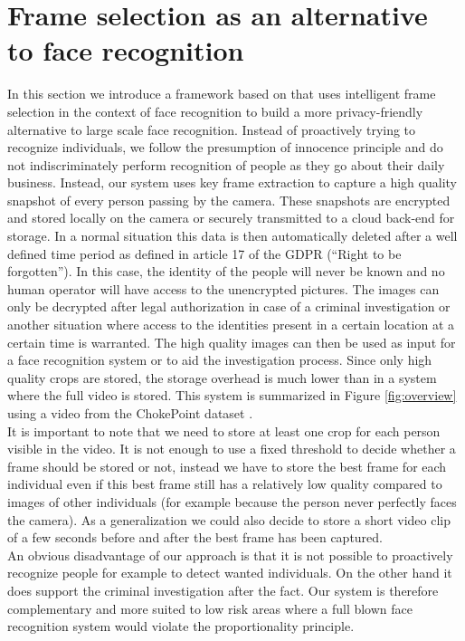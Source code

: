 \documentclass[letterpaper]{article} %
\begin{document}
\section{Frame selection as an alternative to face recognition}
\label{section:privacy_preserving_appr}
In this section we introduce a framework based on \cite{simoens2013scalable} that uses intelligent frame selection in the context of face recognition to build a more privacy-friendly alternative to large scale face recognition. Instead of proactively trying to recognize individuals, we follow the presumption of innocence principle and do not indiscriminately perform recognition of people as they go about their daily business. Instead, our system uses key frame extraction to capture a high quality snapshot of every person passing by the camera. These snapshots are encrypted and stored locally on the camera or securely transmitted to a cloud back-end for storage. In a normal situation this data is then automatically deleted after a well defined time period as defined in article 17 of the GDPR (``Right to be forgotten''). In this case, the identity of the people will never be known and no human operator will have access to the unencrypted pictures. The images can only be decrypted after legal authorization in case of a criminal investigation or another situation where access to the identities present in a certain location at a certain time is warranted. The high quality images can then be used as input for a face recognition system or to aid the investigation process. Since only high quality crops are stored, the storage overhead is much lower than in a system where the full video is stored. This system is summarized in Figure \ref{fig:overview} using a video from the ChokePoint dataset \cite{wong_cvprw_2011}.
\\
\newline
It is important to note that we need to store at least one crop for each person visible in the video. It is not enough to use a fixed threshold to decide whether a frame should be stored or not, instead we have to store the best frame for each individual even if this best frame still has a relatively low quality compared to images of other individuals (for example because the person never perfectly faces the camera). As a generalization we could also decide to store a short video clip of a few seconds before and after the best frame has been captured.
\\
\newline
An obvious disadvantage of our approach is that it is not possible to proactively recognize people for example to detect wanted individuals. On the other hand it does support the criminal investigation after the fact. Our system is therefore complementary and more suited to low risk areas where a full blown face recognition system would violate the proportionality principle. 
\end{document}
